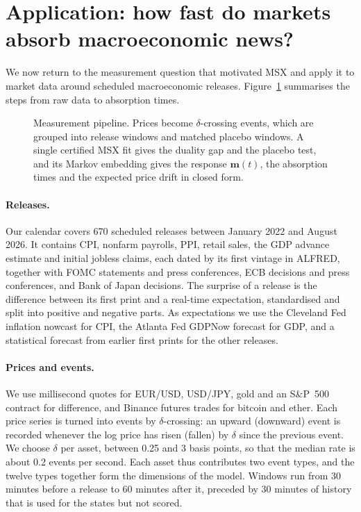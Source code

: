 \section{Application: how fast do markets absorb macroeconomic news?}\label{sec:application}

We now return to the measurement question that motivated MSX and apply it to market data around
scheduled macroeconomic releases. Figure~\ref{fig:pipeline} summarises the steps from raw data to
absorption times.

\begin{figure}[!htbp]\centering

\caption{Measurement pipeline. Prices become $\delta$-crossing events, which are grouped into
release windows and matched placebo windows. A single certified MSX fit gives the duality gap and
the placebo test, and its Markov embedding gives the response $\bm m(t)$, the absorption times and
the expected price drift in closed form.}\label{fig:pipeline}
\end{figure}

\paragraph{Releases.} Our calendar covers 670 scheduled releases between January 2022 and August
2026. It contains CPI, nonfarm payrolls, PPI, retail sales, the GDP advance estimate and initial
jobless claims, each dated by its first vintage in ALFRED, together with FOMC statements and press
conferences, ECB decisions and press conferences, and Bank of Japan decisions. The surprise of a
release is the difference between its first print and a real-time expectation, standardised and
split into positive and negative parts. As expectations we use the Cleveland Fed inflation nowcast
for CPI, the Atlanta Fed GDPNow forecast for GDP, and a statistical forecast from earlier first
prints for the other releases.

\paragraph{Prices and events.} We use millisecond quotes for EUR/USD, USD/JPY, gold and an
S\&P~500 contract for difference, and Binance futures trades for bitcoin and ether. Each price
series is turned into events by $\delta$-crossing: an upward (downward) event is recorded whenever
the log price has risen (fallen) by $\delta$ since the previous event. We choose $\delta$ per asset,
between 0.25 and 3 basis points, so that the median rate is about 0.2 events per second. Each asset
thus contributes two event types, and the twelve types together form the dimensions of the model.
Windows run from 30 minutes before a release to 60 minutes after it, preceded by 30 minutes of
history that is used for the states but not scored.


